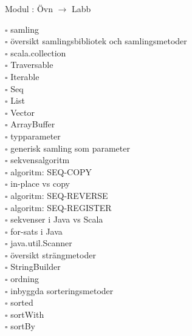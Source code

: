 
    Modul : Övn  $\rightarrow$ Labb 
    \begin{multicols}{3}\SlideFontTiny
    $\square$ samling \\
$\square$ översikt samlingsbibliotek och samlingsmetoder \\
$\square$ scala.collection \\
$\square$ Traversable \\
$\square$ Iterable \\
$\square$ Seq \\
$\square$ List \\
$\square$ Vector \\
$\square$ ArrayBuffer \\
$\square$ typparameter \\
$\square$ generisk samling som parameter \\
$\square$ sekvensalgoritm \\
$\square$ algoritm: SEQ-COPY \\
$\square$ in-place vs copy \\
$\square$ algoritm: SEQ-REVERSE \\
$\square$ algoritm: SEQ-REGISTER \\
$\square$ sekvenser i Java vs Scala \\
$\square$ for-sats i Java \\
$\square$ java.util.Scanner \\
$\square$ översikt strängmetoder \\
$\square$ StringBuilder \\
$\square$ ordning \\
$\square$ inbyggda sorteringsmetoder \\
$\square$ sorted \\
$\square$ sortWith \\
$\square$ sortBy \\
    \end{multicols}
    
